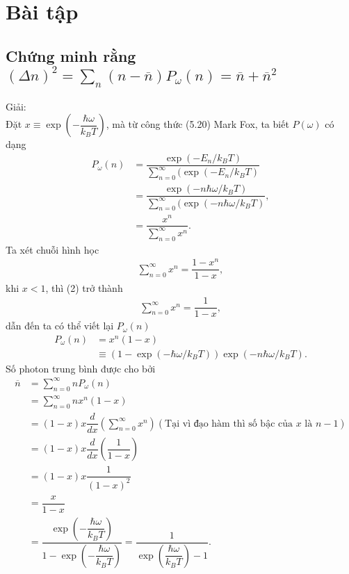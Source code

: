 \documentclass{report}
\newcommand{\dps}{\displaystyle}
\newcommand{\f}[2]{\dfrac{#1}{#2}}
\begin{document}
\section{Bài tập}
\subsection*{Chứng minh rằng $(\Delta n)^2 = \dps\sum_{n} (n - \overline{n}) P_{\omega}(n) = \overline{n} + \overline{n}^2$}
Giải: \\
Đặt $x \equiv \exp(-\f{\hbar \omega}{k_B T})$, mà từ công thức (5.20) Mark Fox, ta biết $P(\omega)$ có dạng
\begin{align*}
	P_{\omega}(n)
	& = \f{\exp(-E_{n} / k_B T)}{\sum_{n = 0}^{\infty}(\exp(-E_{n} / k_B T)}                    \\
	& = \f{\exp(-n \hbar \omega / k_B T)}{\sum_{n = 0}^{\infty}(\exp(-n \hbar \omega / k_B T)}, \\
	& = \f{x^{n}}{\sum_{n = 0}^{\infty} x^{n}}. \tag{1}
\end{align*}
Ta xét chuỗi hình học
\begin{align*}
	\sum_{n = 0}^{\infty} x^{n} = \f{1 - x^n}{1 - x} \tag{2},
\end{align*}
khi $x<1$, thì (2) trở thành
\begin{align*}
	\sum_{n = 0}^{\infty} x^{n} = \f{1}{1 - x}, \tag{3}
\end{align*}
dẫn đến ta có thể viết lại $P_{\omega}(n)$
\begin{align*}
	P_{\omega}(n)
	& = x^{n} (1-x)                                                                               \\
	& \equiv \left( 1 - \exp(-\hbar \omega / k_B T) \right) \exp(-n\hbar \omega / k_B T). \tag{4}
\end{align*}
Số photon trung bình được cho bởi
\begin{align*}
	\overline{n}
	& = \sum_{n = 0}^{\infty} n P_{\omega}(n)                                                                                       \\
	& = \sum_{n = 0}^{\infty} n x^{n} (1-x)                                                                                         \\
	& = (1 - x) x \f{d}{dx} \left( \sum_{n = 0}^{\infty} x^{n} \right) (\text{Tại vì đạo hàm thì số bậc của $x$ là $n - 1$})        \\
	& = (1 - x) x \f{d}{dx} \left(\f{1}{1 - x}\right)                                                                               \\
	& = (1 - x) x \f{1}{(1 - x)^2}                                                                                                  \\
	& = \f{x}{1 - x}                                                                                                                \\
	& = \f{\exp(-\f{\hbar \omega}{k_B T})}{1 - \exp(-\f{\hbar \omega}{k_B T})} = \f{1}{\exp(\f{\hbar \omega}{k_B T}) - 1} . \tag{5}
\end{align*}
\end{document}
